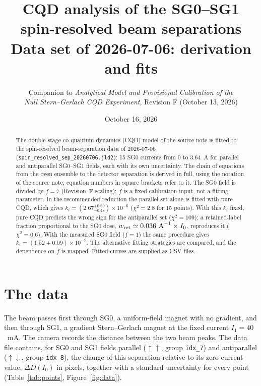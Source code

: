 \documentclass[11pt,a4paper]{article}
\title{CQD analysis of the SG0--SG1 spin-resolved beam separations\\[4pt]
\large Data set of 2026-07-06: derivation and fits}
\author{Companion to \emph{Analytical Model and Provisional Calibration of the}\\
\emph{Null Stern--Gerlach CQD Experiment}, Revision F (October 13, 2026)}
\date{October 16, 2026}
\newcommand{\pp}{{\uparrow\uparrow}}
\newcommand{\pa}{{\uparrow\downarrow}}
\begin{document}
\maketitle

\begin{abstract}
\noindent
The double-stage co-quantum-dynamics (CQD) model of the source note is fitted to the spin-resolved
beam-separation data of 2026-07-06 (\texttt{spin\_resolved\_sep\_20260706.jld2}): 15 SG0 currents
from 0 to 3.64~A for parallel and antiparallel SG0--SG1 fields, each with its own uncertainty. The
chain of equations from the oven ensemble to the detector separation is derived in full, using the
notation of the source note; equation numbers in square brackets refer to it. The SG0 field is
divided by $f=7$ (Revision~F scaling); $f$ is a fixed calibration input, not a fitting parameter.
In the recommended reduction the parallel set alone is fitted with pure CQD, which gives
$k_i=(2.67^{+0.60}_{-0.48})\times10^{-6}$ ($\chi^2=2.8$ for 15 points). With this $k_i$ fixed, pure
CQD predicts the wrong sign for the antiparallel set ($\chi^2=109$); a retained-label fraction
proportional to the SG0 dose, $w_{\rm ret}\simeq0.036~\text{A}^{-1}\times I_0$, reproduces it
($\chi^2=0.6$). With the measured SG0 field ($f=1$) the same procedure gives
$k_i=(1.52\pm0.09)\times10^{-7}$. The alternative fitting strategies are compared, and the
dependence on $f$ is mapped. Fitted curves are supplied as CSV files.
\end{abstract}

\tableofcontents

\section{The data}
\label{sec:data}

The beam passes first through SG0, a uniform-field magnet with no gradient, and then through SG1, a
gradient Stern--Gerlach magnet at the fixed current $I_1=40$~mA. The camera records the distance
between the two beam peaks. The data file contains, for SG0 and SG1 fields parallel ($\pp$, group
\texttt{idx\_7}) and antiparallel ($\pa$, group \texttt{idx\_8}), the change of this separation
relative to its zero-current value, $\Delta D(I_0)$ in pixels, together with a standard uncertainty for
every point (Table~\ref{tab:points}, Figure~\ref{fig:data}).
\end{document}
